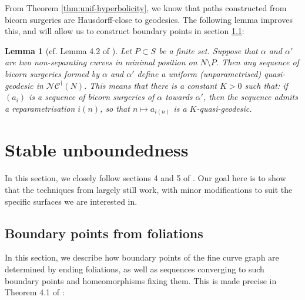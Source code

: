 \documentclass[a4paper]{article}
\newtheorem{lemma}[theorem]{Lemma}
\newcommand{\fncg}{\mathcal{NC}^\dagger}
\begin{document}
From Theorem \ref{thm:unif-hyperbolicity}, we know that paths constructed from bicorn surgeries are Hausdorff-close to geodesics.
The following lemma improves this, and will allow us to construct boundary points in section \ref{subsec:construct-bdary-points}:

\begin{lemma}[cf. Lemma 4.2 of \cite{BHW2}]\label{lem:nice-bicorn-paths}
Let $P\subset S$ be a finite set.
Suppose that $\alpha$ and $\alpha'$ are two non-separating curves in minimal position on $N\setminus P$.
Then any sequence of bicorn surgeries formed by $\alpha$ and $\alpha'$ define a uniform (unparametrised) quasi-geodesic in $\fncg(N)$.
This means that there is a constant $K>0$ such that:
if $(a_i)$ is a sequence of bicorn surgeries of $\alpha$ towards $\alpha'$, then the sequence admits a reparametrisation $i(n)$, so that $n\mapsto a_{i(n)}$ is a $K$-quasi-geodesic.
\end{lemma}

\section{Stable unboundedness}
In this section, we closely follow sections 4 and 5 of \cite{BHW2}.
Our goal here is to show that the techniques from \cite{BHW2} largely still work, with minor modifications to suit the specific surfaces we are interested in.

\subsection{Boundary points from foliations}\label{subsec:construct-bdary-points}
In this section, we describe how boundary points of the fine curve graph are determined by ending foliations, as well as sequences converging to such boundary points and homeomorphisms fixing them.
This is made precise in Theorem 4.1 of \cite{BHW2}:
\end{document}
